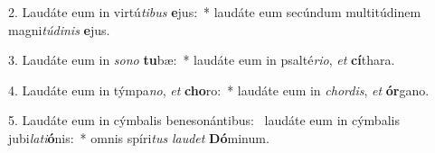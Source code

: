2. Laudáte eum in virtú\textit{ti}\textit{bus} \textbf{e}jus:~*  laudáte eum secúndum multitúdinem magni\textit{tú}\textit{di}\textit{nis} \textbf{e}jus.\

3. Laudáte eum in \textit{so}\textit{no} \textbf{tu}bæ:~*  laudáte eum in psalté\textit{ri}\textit{o}, \textit{et} \textbf{cí}thara.\

4. Laudáte eum in týmpa\textit{no}, \textit{et} \textbf{cho}ro:~*  laudáte eum in \textit{chor}\textit{dis}, \textit{et} \textbf{ór}gano.\

5. Laudáte eum in cýmbalis benesonántibus: \dag\  laudáte eum in cýmbalis jubi\textit{la}\textit{ti}\textbf{ó}nis:~*  omnis spíri\textit{tus} \textit{lau}\textit{det} \textbf{Dó}minum.\

